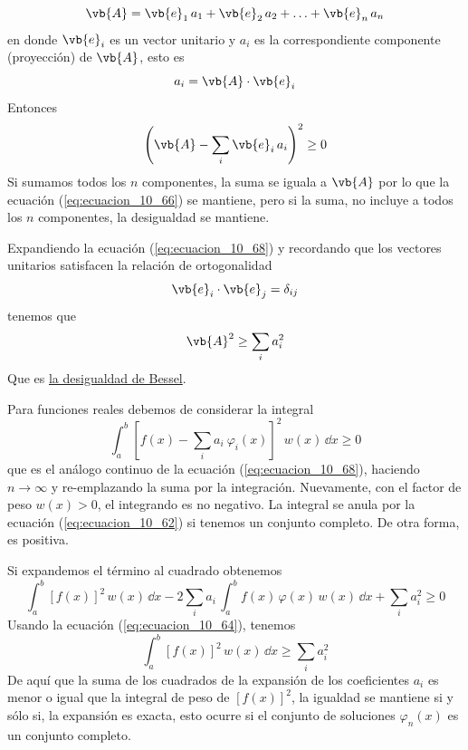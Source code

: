 \begin{equation}
\vb{A} = \vb{e}_{1} \, a_{1} + \vb{e}_{2} \, a_{2} + \ldots + \vb{e}_{n} \, a_{n} 
\label{eq:ecuacion_10_66}
\end{equation}
en donde $\vb{e}_{i}$ es un vector unitario y $a_{i}$ es la correspondiente componente (proyección) de $\vb{A}$, esto es
\begin{equation}
a_{i} = \vb{A} \cdot \vb{e}_{i}
\label{eq:ecuacion_10_67}
\end{equation}
Entonces
\begin{equation}
\left( \vb{A} - \sum_{i} \vb{e}_{i} \, a_{i} \right)^{2} \geq 0
\label{eq:ecuacion_10_68}
 \end{equation}
Si sumamos todos los $n$ componentes, la suma se iguala a $\vb{A}$ por lo que la ecuación (\ref{eq:ecuacion_10_66}) se mantiene, pero si la suma, no incluye a todos los $n$ componentes, la desigualdad se mantiene.
\par
Expandiendo la ecuación (\ref{eq:ecuacion_10_68}) y recordando que los vectores unitarios satisfacen la relación de ortogonalidad
\begin{equation}
\vb{e}_{i} \cdot \vb{e}_{j} =  \delta_{ij}
\label{eq:ecuacion_10_69}
\end{equation}
tenemos que
\begin{equation}
\vb{A}^{2} \geq \sum_{i} a_{i}^{2}
\label{eq:ecuacion_10_70}
\end{equation}
Que es \underline{la desigualdad de Bessel}.
\par
Para funciones reales debemos de considerar la integral
\begin{equation}
\int_{a}^{b} \left[ f(x) - \sum_{i} a_{i} \: \varphi_{i}(x) \right]^{2} \, w(x) \, \dd x \geq 0
\label{eq:ecuacion_10_71}
\end{equation}
que es el análogo continuo de la ecuación (\ref{eq:ecuacion_10_68}), haciendo $n \to \infty$ y re-emplazando la suma por la integración. Nuevamente, con el factor de peso $w(x) >0 $, el integrando es no negativo. La integral se anula por la ecuación (\ref{eq:ecuacion_10_62}) si tenemos un conjunto completo. De otra forma, es positiva.

Si expandemos el término al cuadrado obtenemos
\begin{equation}
\int_{a}^{b} [ f(x) ]^{2} \, w(x) \, \dd x - 2 \sum_{i} a_{i} \, \int_{a}^{b} f(x) \, \varphi (x) \, w(x) \, \dd x  + \sum_{i} a_{i}^{2} \geq 0
\label{eq:ecuacion_10_72}
\end{equation}
Usando la ecuación (\ref{eq:ecuacion_10_64}), tenemos
\begin{equation}
\int_{a}^{b} [f(x)]^{2} \, w(x) \, \dd x \geq \sum_{i} a_{i}^{2}
\label{eq:ecuacion_10_73}
\end{equation}
De aquí que la suma de los cuadrados de la expansión de los coeficientes $a_{i}$ es menor o igual que la integral de peso de $[f(x)]^{2}$, la igualdad se mantiene si y sólo si, la expansión es exacta, esto ocurre si el conjunto de soluciones $\varphi_{n}(x)$ es un conjunto completo.
